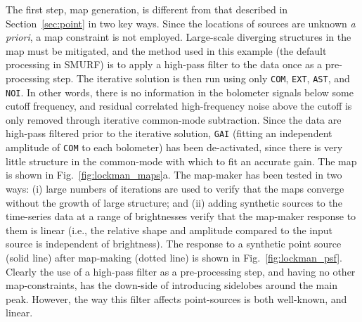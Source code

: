 \documentclass[useAMS,usenatbib,nofootinbib]{mn2e}
\newcommand{\model}[1]{\texttt{#1}}
\begin{document}
The first step, map generation, is different from that described in
Section~\ref{sec:point} in two key ways. Since the locations of
sources are unknown \emph{a priori}, a map constraint is not
employed. Large-scale diverging structures in the map must be
mitigated, and the method used in this example (the default processing
in SMURF) is to apply a high-pass filter to the data once as a
pre-processing step. The iterative solution is then run using only
\model{COM}, \model{EXT}, \model{AST}, and \model{NOI}. In other
words, there is no information in the bolometer signals below some
cutoff frequency, and residual correlated high-frequency noise above
the cutoff is only removed through iterative common-mode
subtraction. Since the data are high-pass filtered prior to the
iterative solution, \model{GAI} (fitting an independent amplitude of
\model{COM} to each bolometer) has been de-activated, since there is
very little structure in the common-mode with which to fit an accurate
gain. The map is shown in Fig.~\ref{fig:lockman_maps}a. The map-maker
has been tested in two ways: (i) large numbers of iterations are used
to verify that the maps converge without the growth of large
structure; and (ii) adding synthetic sources to the time-series data
at a range of brightnesses verify that the map-maker response to them
is linear (i.e., the relative shape and amplitude compared to the
input source is independent of brightness). The response to a
synthetic point source (solid line) after map-making (dotted line) is
shown in Fig.~\ref{fig:lockman_psf}. Clearly the use of a high-pass
filter as a pre-processing step, and having no other map-constraints,
has the down-side of introducing sidelobes around the main
peak. However, the way this filter affects point-sources is both
well-known, and linear.
\end{document}
